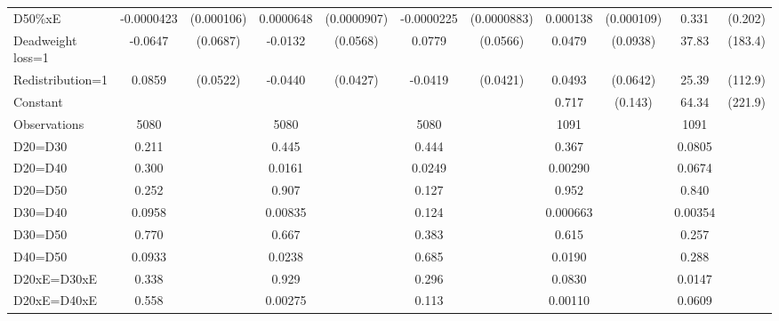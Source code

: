 \begin{tabular}{l|cccccc|cc|cc}
D50\%xE         &-0.0000423         &(0.000106)&0.0000648         &(0.0000907)&-0.0000225         &(0.0000883)& 0.000138         &(0.000109)&    0.331         &  (0.202)\\
Deadweight loss=1&  -0.0647         & (0.0687)&  -0.0132         & (0.0568)&   0.0779         & (0.0566)&   0.0479         & (0.0938)&    37.83         &  (183.4)\\
Redistribution=1&   0.0859         & (0.0522)&  -0.0440         & (0.0427)&  -0.0419         & (0.0421)&   0.0493         & (0.0642)&    25.39         &  (112.9)\\
Constant        &                  &         &                  &         &                  &         &    0.717\sym{***}&  (0.143)&    64.34         &  (221.9)\\
\hline
Observations    &     5080         &         &     5080         &         &     5080         &         &     1091         &         &     1091         &         \\
D20=D30         &    0.211         &         &    0.445         &         &    0.444         &         &    0.367         &         &   0.0805         &         \\
D20=D40         &    0.300         &         &   0.0161         &         &   0.0249         &         &  0.00290         &         &   0.0674         &         \\
D20=D50         &    0.252         &         &    0.907         &         &    0.127         &         &    0.952         &         &    0.840         &         \\
D30=D40         &   0.0958         &         &  0.00835         &         &    0.124         &         & 0.000663         &         &  0.00354         &         \\
D30=D50         &    0.770         &         &    0.667         &         &    0.383         &         &    0.615         &         &    0.257         &         \\
D40=D50         &   0.0933         &         &   0.0238         &         &    0.685         &         &   0.0190         &         &    0.288         &         \\
D20xE=D30xE     &    0.338         &         &    0.929         &         &    0.296         &         &   0.0830         &         &   0.0147         &         \\
D20xE=D40xE     &    0.558         &         &  0.00275         &         &    0.113         &         &  0.00110         &         &   0.0609         &         \\

\end{tabular}
